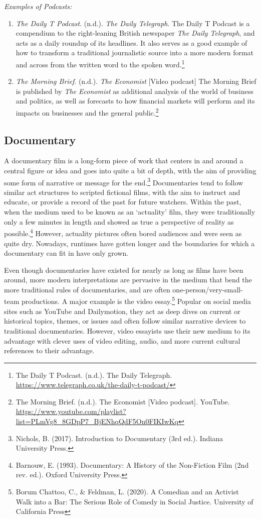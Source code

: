 \emph{Examples of Podcasts:}

\begin{enumerate}
  \item \emph{The Daily T Podcast}. (n.d.). \emph{The Daily Telegraph}. The Daily T Podcast is a compendium to the right-leaning British newspaper \emph{The Daily Telegraph}, and acts as a daily roundup of its headlines. It also serves as a good example of how to transform a traditional journalistic source into a more modern format and across from the written word to the spoken word.\footnote{The Daily T Podcast. (n.d.). The Daily Telegraph. \url{https://www.telegraph.co.uk/the-daily-t-podcast/}}
  \item \emph{The Morning Brief}. (n.d.). \emph{The Economist} [Video podcast] The Morning Brief is published by \emph{The Economist} as additional analysis of the world of business and politics, as well as forecasts to how financial markets will perform and its impacts on businesses and the general public.\footnote{The Morning Brief. (n.d.). The Economist [Video podcast]. YouTube. \url{https://www.youtube.com/playlist?list=PLmVg8_8GDpP7_BjENhqQdF5On0FIKIwKq}}
\end{enumerate}

\subsection{Documentary}

A documentary film is a long-form piece of work that centers in and around a central figure or idea and goes into quite a bit of depth, with the aim of providing some form of narrative or message for the end.\footnote{Nichols, B. (2017). Introduction to Documentary (3rd ed.). Indiana University Press.} Documentaries tend to follow similar act structures to scripted fictional films, with the aim to instruct and educate, or provide a record of the past for future watchers. Within the past, when the medium used to be known as an ‘actuality’ film, they were traditionally only a few minutes in length and showed as true a perspective of reality as possible.\footnote{Barnouw, E. (1993). Documentary: A History of the Non-Fiction Film (2nd rev. ed.). Oxford University Press.} However, actuality pictures often bored audiences and were seen as quite dry. Nowadays, runtimes have gotten longer and the boundaries for which a documentary can fit in have only grown.

Even though documentaries have existed for nearly as long as films have been around, more modern interpretations are pervasive in the medium that bend the more   traditional   rules   of   documentaries,   and   are   often one-person/very-small-team productions. A major example is the video essay.\footnote{Borum Chattoo, C., \& Feldman, L. (2020). A Comedian and an Activist Walk into a Bar: The Serious Role of Comedy in Social Justice. University of California Press} Popular on social media sites such as YouTube and Dailymotion, they act as deep dives on current or historical topics, themes, or issues and often follow similar narrative devices to traditional documentaries. However, video essayists use their new medium to its advantage with clever uses of video editing, audio, and more current cultural references to their advantage.


